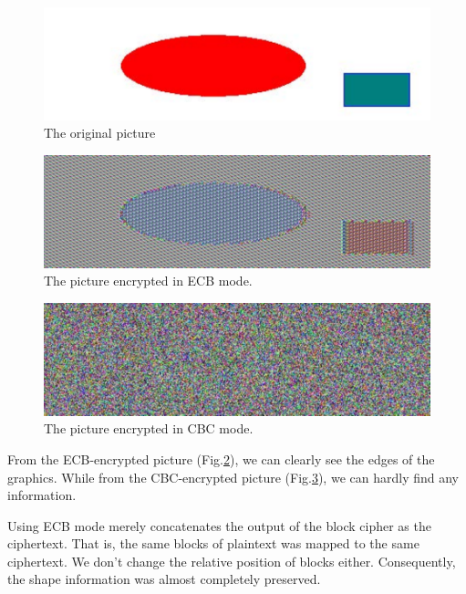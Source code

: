 \begin{figure}[tb!]
\centering
\includegraphics[width=\columnwidth]{pictures/pic_original.pdf}
\caption{
    The original picture
}
\label{fig:pic_original}
\end{figure}

\begin{figure}[tb!]
\centering
\includegraphics[width=\columnwidth]{pictures/pic_ecb.pdf}
\caption{
    The picture encrypted in ECB mode.
}
\label{fig:pic_ecb}
\end{figure}

\begin{figure}[tb!]
\centering
\includegraphics[width=\columnwidth]{pictures/pic_cbc.pdf}
\caption{
    The picture encrypted in CBC mode.
}
\label{fig:pic_cbc}
\end{figure}

From the ECB-encrypted picture (Fig.\ref{fig:pic_ecb}), we can clearly see the edges of the graphics.
While from the CBC-encrypted picture (Fig.\ref{fig:pic_cbc}), we can hardly find any information.

Using ECB mode merely concatenates the output of the block cipher as the ciphertext. 
That is, the same blocks of plaintext was mapped to the same ciphertext.
We don't change the relative position of blocks either. Consequently, the shape information was almost completely preserved. 


